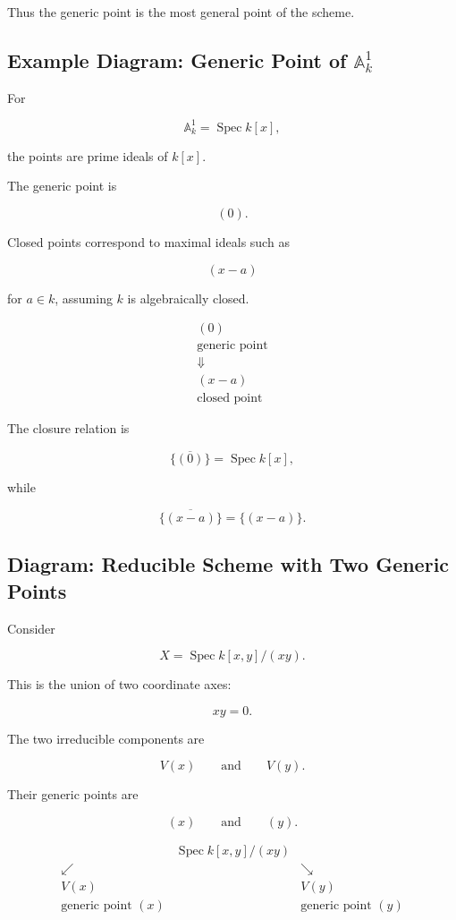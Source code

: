 \documentclass[12pt,a4paper]{article}
\theoremstyle{notespace}
\begin{document}
Thus the generic point is the most general point of the scheme.

\subsection{Example Diagram: Generic Point of \(\mathbb{A}^1_k\)}

For

\[
\mathbb{A}^1_k=\operatorname{Spec}k[x],
\]

the points are prime ideals of \(k[x]\).

The generic point is

\[
(0).
\]

Closed points correspond to maximal ideals such as

\[
(x-a)
\]

for \(a\in k\), assuming \(k\) is algebraically closed.

\[
\begin{array}{c}
	\boxed{(0)}
	\\[0.5em]
	\text{generic point}
	\\[1em]
	\Downarrow
	\\[1em]
	\boxed{(x-a)}
	\\[0.5em]
	\text{closed point}
\end{array}
\]

The closure relation is

\[
\overline{\{(0)\}}
=
\operatorname{Spec}k[x],
\]

while

\[
\overline{\{(x-a)\}}
=
\{(x-a)\}.
\]

\subsection{Diagram: Reducible Scheme with Two Generic Points}

Consider

\[
X=\operatorname{Spec}k[x,y]/(xy).
\]

This is the union of two coordinate axes:

\[
xy=0.
\]

The two irreducible components are

\[
V(x)
\qquad\text{and}\qquad
V(y).
\]

Their generic points are

\[
(x)
\qquad\text{and}\qquad
(y).
\]

\[
\begin{array}{ccc}
	& \operatorname{Spec}k[x,y]/(xy) & 
	\\[0.5em]
	\swarrow & & \searrow
	\\[0.5em]
	V(x) & & V(y)
	\\[0.5em]
	\text{generic point } (x) & & \text{generic point } (y)
\end{array}
\]
\end{document}
